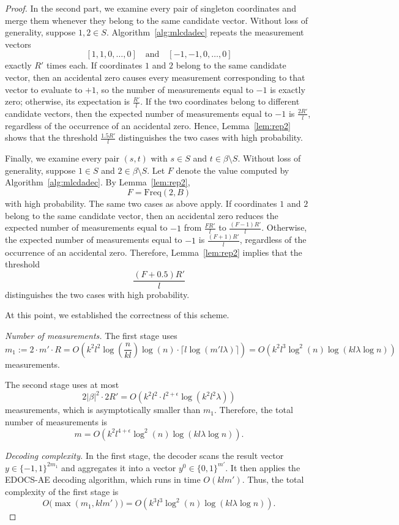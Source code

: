 \documentclass[10pt,a4paper]{amsart}
\begin{document}
\begin{proof}
In the second part, we examine every pair of singleton coordinates and merge them whenever they belong to the same candidate vector. Without loss of generality, suppose $1,2\in S$. Algorithm~\ref{alg:mlcdadec} repeats the measurement vectors
\[
[1,1,0,\ldots,0]
\quad\text{and}\quad
[-1,-1,0,\ldots,0]
\]
exactly $R'$ times each. If coordinates $1$ and $2$ belong to the same candidate vector, then an accidental zero causes every measurement corresponding to that vector to evaluate to $+1$, so the number of measurements equal to $-1$ is exactly zero; otherwise, its expectation is $\frac{R'}{l}$. If the two coordinates belong to different candidate vectors, then the expected number of measurements equal to $-1$ is $\frac{2R'}{l}$, regardless of the occurrence of an accidental zero. Hence, Lemma~\ref{lem:rep2} shows that the threshold $\frac{1.5R'}{l}$ distinguishes the two cases with high probability.

Finally, we examine every pair $(s,t)$ with $s\in S$ and $t\in\beta\setminus S$. Without loss of generality, suppose $1\in S$ and $2\in\beta\setminus S$. Let $F$ denote the value computed by Algorithm~\ref{alg:mlcdadec}. By Lemma~\ref{lem:rep2},
\[
F=\mathrm{Freq}(2,B)
\]
with high probability. The same two cases as above apply. If coordinates $1$ and $2$ belong to the same candidate vector, then an accidental zero reduces the expected number of measurements equal to $-1$ from $\frac{FR'}{l}$ to $\frac{(F-1)R'}{l}$. Otherwise, the expected number of measurements equal to $-1$ is $\frac{(F+1)R'}{l}$, regardless of the occurrence of an accidental zero. Therefore, Lemma~\ref{lem:rep2} implies that the threshold
\[
\frac{(F+0.5)R'}{l}
\]
distinguishes the two cases with high probability.

At this point, we established the correctness of this scheme.

\emph{Number of measurements.}
The first stage uses
\[
m_1 := 2\cdot m' \cdot R = O\!\left(k^2 l^2 \log\!\left(\frac{n}{kl}\right)\log (n) \cdot \lceil l \log(m' l \lambda)\rceil\right)
= O\!\left(k^2 l^3 \log^2 (n) \log(kl \lambda \log n)\right)
\]
measurements.

The second stage uses at most
\[
2|\beta|^2 \cdot 2R'
= O\!\left(k^2 l^2 \cdot l^{2+\epsilon} \log(k^2 l^2 \lambda)\right)
\]
measurements, which is asymptotically smaller than $m_1$. Therefore, the total number of measurements is
\[
m = O\!\left(k^2 l^{4+\epsilon} \log^2 (n) \log(kl \lambda \log n)\right).
\]

\medskip

\emph{Decoding complexity.}
In the first stage, the decoder scans the result vector $y \in \{-1,1\}^{2m_1}$ and aggregates it into a vector $y^0 \in \{0,1\}^{m'}$. It then applies the EDOCS-AE decoding algorithm, which runs in time $O(kl m')$. Thus, the total complexity of the first stage is
\[
O\bigl(\max(m_1, kl m')\bigr) = O\!\left(k^3 l^3 \log^2 (n)\log(kl\lambda\log n)\right).
\]


\end{proof}
\end{document}
